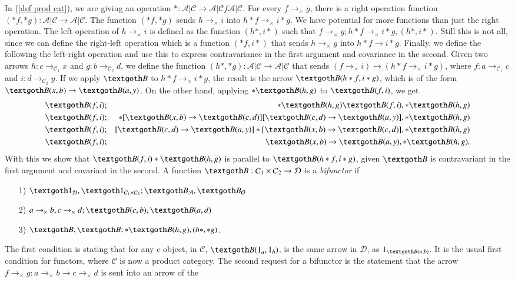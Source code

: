 \documentclass [12pt]{book}
\begin{document}
In (\ref {def prod cat}), we are giving an operation $*:\mathcal{A|C}\rightarrow\mathcal {A|C}f\mathcal{A|C}$. For every $f\rightarrow_\times g$, there is a right operation function $(*f,*g):\mathcal{A|C}\rightarrow\mathcal {A|C}$. The function $(*f,*g)$ sends $h\rightarrow_\times i$ into $h*f\rightarrow_\times i*g$. We have potential for more functions than just the right operation. The left operation of $h\rightarrow_\times i$ is defined as the function $(h*,i*)$ such that $f\rightarrow_\times g;h*f\rightarrow_\times i*g,(h*,i*)$. Still this is not all, since we can define the right-left operation which is a function $(*f,i*)$ that sends $h\rightarrow_\times g$ into $h*f\rightarrow i*g$. Finally, we define the following the left-right operation and use this to express contravariance in the first argument and covariance in the second. Given two arrows $h:c\rightarrow_{\mathcal C_1}x$ and $g:b\rightarrow_{\mathcal C_2}d$, we define the function $(h*,*g):\mathcal{A|C}\rightarrow\mathcal{A|C}$ that sends $(f\rightarrow_\times i)\mapsto(h*f\rightarrow_\times i*g)$, where $f:a\rightarrow_{\mathcal C_1}c$ and $i:d\rightarrow_{\mathcal C_2}y$. If we apply $\textgoth B$ to $h*f\rightarrow_\times i*g$, the result is the arrow $\textgoth B(h*f,i*g)$, which is of the form $\textgoth B(x,b)\rightarrow\textgoth B(a,y)$. On the other hand, applying $*\textgoth B(h,g)$ to $\textgoth B(f,i)$, we get \begin{eqnarray}\nonumber \textgoth B(f,i)&;&*\textgoth B(h,g)\textgoth B(f,i),*\textgoth B(h,g)\\\nonumber \textgoth B(f,i)&;&*[\textgoth B(x,b)\rightarrow\textgoth B(c,d)][\textgoth B(c,d)\rightarrow\textgoth B(a,y)],*\textgoth B(h,g)\\\nonumber \textgoth B(f,i)&;&[\textgoth B(c,d)\rightarrow\textgoth B(a,y)]*[\textgoth B(x,b)\rightarrow\textgoth B(c,d)],*\textgoth B(h,g)\\\nonumber \textgoth B(f,i)&;&\textgoth B(x,b)\rightarrow\textgoth B(a,y),*\textgoth B(h,g).\end{eqnarray} With this we show that $\textgoth B(f,i)*\textgoth B(h,g)$ is parallel to $\textgoth B(h*f,i*g)$, given $\textgoth B$ is contravariant in the first argument and covariant in the second. A function $\textgoth B:\mathcal C_1\times\mathcal C_2\rightarrow\mathcal D$ is a \textit{bifunctor} if\begin{itemize}\item[1)]$\textgoth1_\mathcal D,\textgoth1_{\mathcal C_1\times\mathcal C_2};\textgoth B_\mathcal A,\textgoth B_\mathcal O$\item[2)]$a\rightarrow_\times b,c\rightarrow_\times d;\textgoth B(c,b),\textgoth B(a,d)$\item[3)]$\textgoth B,\textgoth B;*\textgoth B(h,g),(h*,*g)$.\end{itemize}The first condition is stating that for any c-object, in $\mathcal C$, $\textgoth B(1_a,1_b)$, is the same arrow in $\mathcal D$, as $1_{\textgoth B(a,b)}$. It is the usual first condition for functors, where $\mathcal C$ is now a product category. The second request for a bifunctor is the statement that the arrow $f\rightarrow_\times g:a\rightarrow_\times b\longrightarrow c\rightarrow_\times d$ is sent into an arrow of the 
\end{document}
